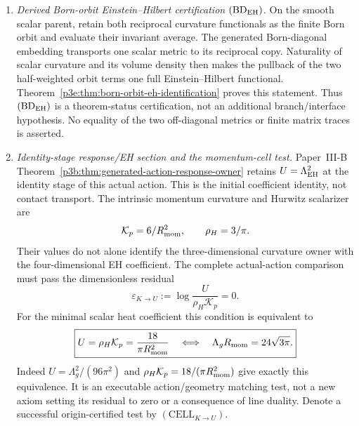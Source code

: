 \documentclass[12pt,a4paper]{article}
\begin{document}
\begin{definition}
\begin{enumerate}[label=(\roman*)]
\item \emph{Derived Born-orbit Einstein--Hilbert certification
\((\mathrm{BD}_{\rm EH})\).}
On the smooth scalar parent, retain both reciprocal curvature functionals as
the finite Born orbit and evaluate their invariant average.  The generated
Born-diagonal embedding transports one scalar metric to its reciprocal copy.
Naturality of scalar curvature and its volume density then makes the pullback
of the two half-weighted orbit terms one full Einstein--Hilbert functional.
Theorem~\ref{p3e:thm:born-orbit-eh-identification} proves this statement.
Thus \((\mathrm{BD}_{\rm EH})\) is a theorem-status certification, not an
additional branch/interface hypothesis.  No equality of the two off-diagonal
metrics or finite matrix traces is asserted.

\item \emph{Identity-stage response/EH section and the momentum-cell test.}
Paper~III-B Theorem~\ref{p3b:thm:generated-action-response-owner} retains
$U=\Lambda_{\rm EH}^2$ at the identity stage of this actual action.
This is the initial coefficient identity, not contact transport.
The intrinsic momentum curvature and Hurwitz scalarizer are
\[
 \mathcal K_p=6/R_{\mathrm{mom}}^2,\qquad \rho_H=3/\pi.
\]
Their values do not alone identify the three-dimensional curvature owner
with the four-dimensional EH coefficient. The complete actual-action
comparison must pass the dimensionless residual
\begin{equation}
\label{p3e:eq:v2211-momentum-eh-port}
 \boxed{\varepsilon_{K\to U}:=
 \log\frac{U}{\rho_H\mathcal K_p}=0.}
\end{equation}
For the minimal scalar heat coefficient this condition is equivalent to
\begin{equation}
\label{p3e:eq:hurwitz-cell-normalized-eh-handoff}
 \boxed{U=\rho_H\mathcal K_p=\frac{18}{\pi R_{\mathrm{mom}}^2}
 \quad\Longleftrightarrow\quad
 \Lambda_gR_{\mathrm{mom}}=24\sqrt{3\pi}.}
\end{equation}
Indeed $U=\Lambda_g^2/(96\pi^2)$ and
$\rho_H\mathcal K_p=18/(\pi R_{\mathrm{mom}}^2)$ give exactly this equivalence.
It is an executable action/geometry matching test, not a new axiom setting
its residual to zero or a consequence of line duality. Denote a successful
origin-certified test by $(\mathrm{CELL}_{K\to U})$.


\end{enumerate}
\end{definition}
\end{document}
